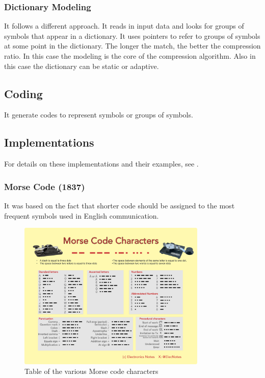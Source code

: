 \documentclass[12pt, a4paper]{report}
\begin{document}
\subsubsection{Dictionary Modeling}

It follows a different approach. It reads in input data and looks for groups of symbols that appear in a dictionary.
It uses pointers to refer to groups of symbols at some point in the dictionary.
The longer the match, the better the compression ratio.
In this case the modeling is the core of the compression algorithm.
Also in this case the dictionary can be static or adaptive.

\subsection{Coding}

It generate codes to represent symbols or groups of symbols.

\subsection{Implementations}

For details on these implementations and their examples, see \cite{TheDataCompressionBook2ndEdition}.

\subsubsection{Morse Code (1837)}

It was based on the fact that shorter code should be assigned to the most frequent symbols used in English communication.

\begin{figure}[H]
  \centering
  \includegraphics[width=0.8\textwidth]{morse-code-characters-infographic}
  \caption{Table of the various Morse code characters}
  \label{fig:morse_code_pdf}
\end{figure}
\end{document}
